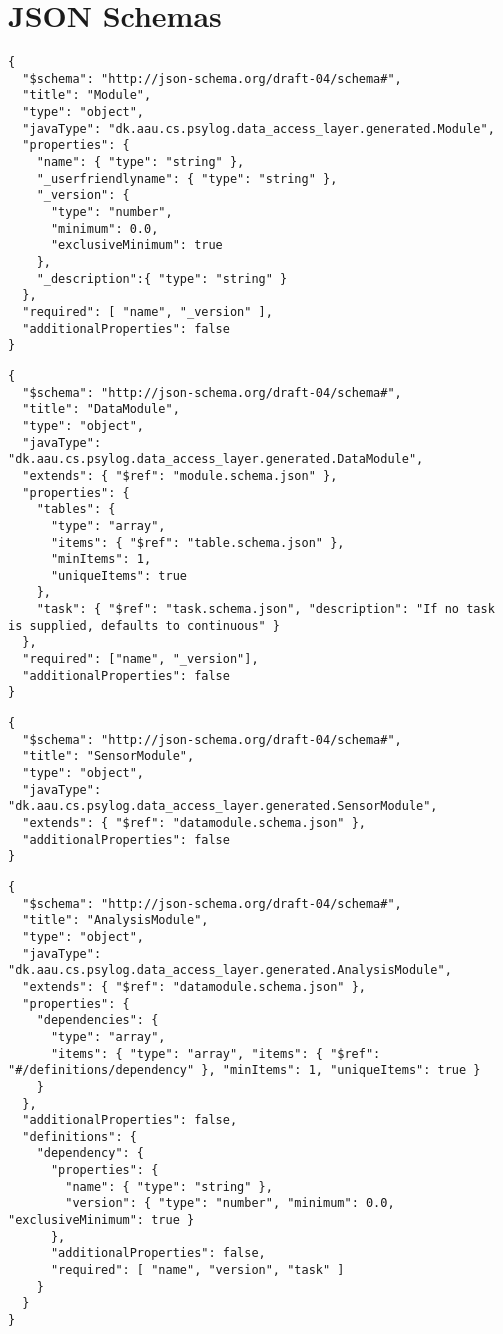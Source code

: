 \chapter{JSON Schemas}\label{app:json_schema}

\begin{lstlisting}[caption=Module]
{
  "$schema": "http://json-schema.org/draft-04/schema#",
  "title": "Module",
  "type": "object",
  "javaType": "dk.aau.cs.psylog.data_access_layer.generated.Module",
  "properties": {
    "name": { "type": "string" },
    "_userfriendlyname": { "type": "string" },
    "_version": {
      "type": "number",
      "minimum": 0.0,
      "exclusiveMinimum": true
    },
    "_description":{ "type": "string" }
  },
  "required": [ "name", "_version" ],
  "additionalProperties": false
}
\end{lstlisting}

\begin{lstlisting}[caption=DataModule]
{
  "$schema": "http://json-schema.org/draft-04/schema#",
  "title": "DataModule",
  "type": "object",
  "javaType": "dk.aau.cs.psylog.data_access_layer.generated.DataModule",
  "extends": { "$ref": "module.schema.json" },
  "properties": {
    "tables": {
      "type": "array",
      "items": { "$ref": "table.schema.json" },
      "minItems": 1,
      "uniqueItems": true
    },
    "task": { "$ref": "task.schema.json", "description": "If no task is supplied, defaults to continuous" }
  },
  "required": ["name", "_version"],
  "additionalProperties": false
}
\end{lstlisting}

\begin{lstlisting}[caption=SensorModule]
{
  "$schema": "http://json-schema.org/draft-04/schema#",
  "title": "SensorModule",
  "type": "object",
  "javaType": "dk.aau.cs.psylog.data_access_layer.generated.SensorModule",
  "extends": { "$ref": "datamodule.schema.json" },
  "additionalProperties": false
}
\end{lstlisting}

\begin{lstlisting}[caption=AnalysisModule]
{
  "$schema": "http://json-schema.org/draft-04/schema#",
  "title": "AnalysisModule",
  "type": "object",
  "javaType": "dk.aau.cs.psylog.data_access_layer.generated.AnalysisModule",
  "extends": { "$ref": "datamodule.schema.json" },
  "properties": {
    "dependencies": {
      "type": "array",
      "items": { "type": "array", "items": { "$ref": "#/definitions/dependency" }, "minItems": 1, "uniqueItems": true }
    }
  },
  "additionalProperties": false,
  "definitions": {
    "dependency": {
      "properties": {
        "name": { "type": "string" },
        "version": { "type": "number", "minimum": 0.0, "exclusiveMinimum": true }
      },
      "additionalProperties": false,
      "required": [ "name", "version", "task" ]
    }
  }
}
\end{lstlisting}

